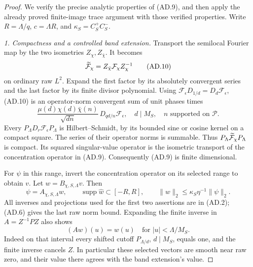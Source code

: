 \begin{proof}
We verify the precise analytic properties of
(AD.9), and then apply the already proved finite-image
trace argument with those verified properties.
Write \(R=\Lambda/q\), \(c=\Lambda R\), and
\(\kappa_S=C_S^+C_S^-\).

\emph{1. Compactness and a controlled band extension.}
Transport the semilocal Fourier map by the two
isometries \(Z_\chi,Z_{\bar\chi}\).
It becomes
\[
       \widetilde{\cal F}_\chi
             =Z_{\bar\chi}{\cal F}_\chi Z_\chi^{-1}
 \tag{AD.10}
\]
on ordinary raw \(L^2\).
Expand the first factor by its absolutely convergent
series and the last factor by its finite divisor
polynomial.  Using
\(\mathcal F_\epsilon D_{1/d}=D_d\mathcal F_\epsilon\),
(AD.10) is an operator-norm convergent sum of
unit phases times
\[
        \frac{\mu(d)\chi(d)\bar\chi(n)}{\sqrt{dn}}\,
                     D_{qd/n}\mathcal F_\epsilon ,
 \quad d\mid M_S,\quad n\text{ supported on }\mathcal P.
 \tag{AD.11}
\]
Every \(P_\Lambda D_r\mathcal F_\epsilon P_\Lambda\)
is Hilbert--Schmidt, by its bounded sine or cosine
kernel on a compact square.
The series of their operator norms is summable.
Thus \(P_\Lambda\widetilde{\cal F}_\chi P_\Lambda\)
is compact.  Its squared singular-value operator
is the isometric transport of the concentration
operator in (AD.9).
Consequently (AD.9) is finite dimensional.

For \(\psi\) in this range, invert the concentration
operator on its selected range to obtain \(v\).
Let \(w=B_{\chi,S,\Lambda}v\).
Then
\[
             \psi=A_{\chi,S,\Lambda}w,\qquad
             \operatorname{supp}\widehat w
                        \subset[-R,R],\qquad
             \|w\|_2\leq\kappa_S\eta^{-1}\|\psi\|_2.
 \tag{AD.12}
\]
All inverses and projections used for the first
two assertions are in (AD.2); (AD.6) gives the
last raw norm bound.
Expanding the finite inverse in \(A=Z^{-1}PZ\)
also shows
\[
             (Aw)(u)=w(u)\quad
                         \text{for }|u|<\Lambda/M_S.
 \tag{AD.13}
\]
Indeed on that interval every shifted cutoff
\(P_{\Lambda/d}\), \(d\mid M_S\), equals one,
and the finite inverse cancels \(Z\).
In particular these selected vectors are smooth
near raw zero, and their value there agrees
with the band extension's value.


\end{proof}
